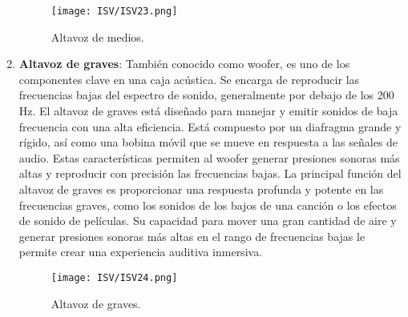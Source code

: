 \documentclass[
	12pt, %
	fleqn, %
	a4paper, %
	oneside, %
]{LegrandOrangeBook}
\begin{document}
\begin{enumerate}
\begin{figure}[H]
\centering
\texttt{[image: ISV/ISV23.png]}
\caption{Altavoz de medios.}
\end{figure}
\item \textbf{Altavoz de graves}: También conocido como woofer, es uno de los componentes clave en una caja acústica. Se encarga de reproducir las frecuencias bajas del espectro de sonido, generalmente por debajo de los 200 Hz. El altavoz de graves está diseñado para manejar y emitir sonidos de baja frecuencia con una alta eficiencia. Está compuesto por un diafragma grande y rígido, así como una bobina móvil que se mueve en respuesta a las señales de audio. Estas características permiten al woofer generar presiones sonoras más altas y reproducir con precisión las frecuencias bajas. La principal función del altavoz de graves es proporcionar una respuesta profunda y potente en las frecuencias graves, como los sonidos de los bajos de una canción o los efectos de sonido de películas. Su capacidad para mover una gran cantidad de aire y generar presiones sonoras más altas en el rango de frecuencias bajas le permite crear una experiencia auditiva inmersiva.
\begin{figure}[H]
\centering
\texttt{[image: ISV/ISV24.png]}
\caption{Altavoz de graves.}
\end{figure}
\end{enumerate}
\end{document}

